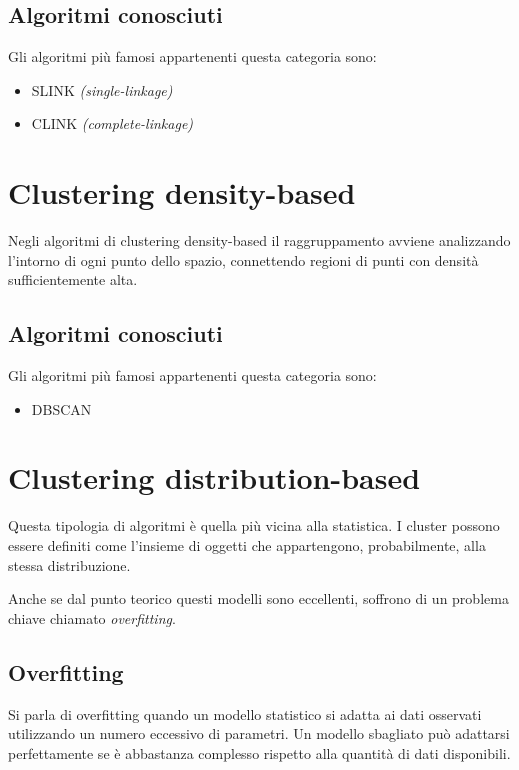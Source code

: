 	\subsection{Algoritmi conosciuti}
		Gli algoritmi più famosi appartenenti questa categoria sono:
		\begin{itemize}
			\item SLINK \emph{(single-linkage)}
		  	\item CLINK \emph{(complete-linkage)}
		\end{itemize}

\section{Clustering density-based}
	Negli algoritmi di clustering density-based il raggruppamento avviene analizzando l'intorno di ogni punto dello spazio, connettendo regioni di punti con densità sufficientemente alta.
	
	\subsection{Algoritmi conosciuti}		
		Gli algoritmi più famosi appartenenti questa categoria sono:
		\begin{itemize}
		  	\item DBSCAN
		\end{itemize}

\section{Clustering distribution-based}
	Questa tipologia di algoritmi è quella più vicina alla statistica. I cluster possono essere definiti come l'insieme di oggetti che appartengono, probabilmente, alla stessa distribuzione.

	Anche  se dal punto teorico questi modelli sono eccellenti, soffrono di un problema chiave chiamato \emph{overfitting}. 

	\subsection{Overfitting}
		Si parla di overfitting quando un modello statistico si adatta ai dati osservati utilizzando un numero eccessivo di parametri. Un modello sbagliato può adattarsi perfettamente se è abbastanza complesso rispetto alla quantità di dati disponibili. 

